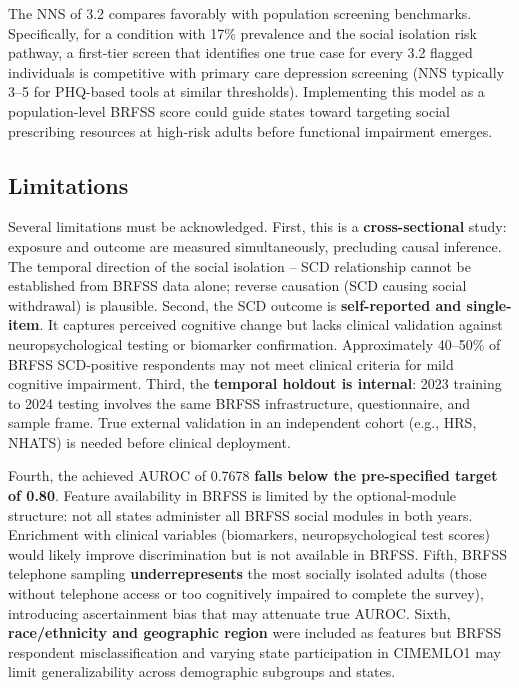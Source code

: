 \documentclass[12pt,a4paper]{article}
\begin{document}
The NNS of 3.2 compares favorably with population screening benchmarks.
Specifically, for a condition with 17\% prevalence and the social isolation risk
pathway, a first-tier screen that identifies one true case for every 3.2 flagged
individuals is competitive with primary care depression screening (NNS typically
3--5 for PHQ-based tools at similar thresholds). Implementing this model as a
population-level BRFSS score could guide states toward targeting social
prescribing resources at high-risk adults before functional impairment emerges.

\subsection{Limitations}

Several limitations must be acknowledged. First, this is a \textbf{cross-sectional}
study: exposure and outcome are measured simultaneously, precluding causal
inference. The temporal direction of the social isolation -- SCD relationship
cannot be established from BRFSS data alone; reverse causation (SCD causing
social withdrawal) is plausible. Second, the SCD outcome is \textbf{self-reported
and single-item}. It captures perceived cognitive change but lacks clinical
validation against neuropsychological testing or biomarker confirmation.
Approximately 40--50\% of BRFSS SCD-positive respondents may not meet clinical
criteria for mild cognitive impairment. Third, the \textbf{temporal holdout is
internal}: 2023 training to 2024 testing involves the same BRFSS infrastructure,
questionnaire, and sample frame. True external validation in an independent
cohort (e.g., HRS, NHATS) is needed before clinical deployment.

Fourth, the achieved AUROC of 0.7678 \textbf{falls below the pre-specified
target of 0.80}. Feature availability in BRFSS is limited by the optional-module
structure: not all states administer all BRFSS social modules in both years.
Enrichment with clinical variables (biomarkers, neuropsychological test scores)
would likely improve discrimination but is not available in BRFSS. Fifth,
BRFSS telephone sampling \textbf{underrepresents} the most socially isolated
adults (those without telephone access or too cognitively impaired to complete
the survey), introducing ascertainment bias that may attenuate true AUROC.
Sixth, \textbf{race/ethnicity and geographic region} were included as features
but BRFSS respondent misclassification and varying state participation in
CIMEMLO1 may limit generalizability across demographic subgroups and states.
\end{document}
